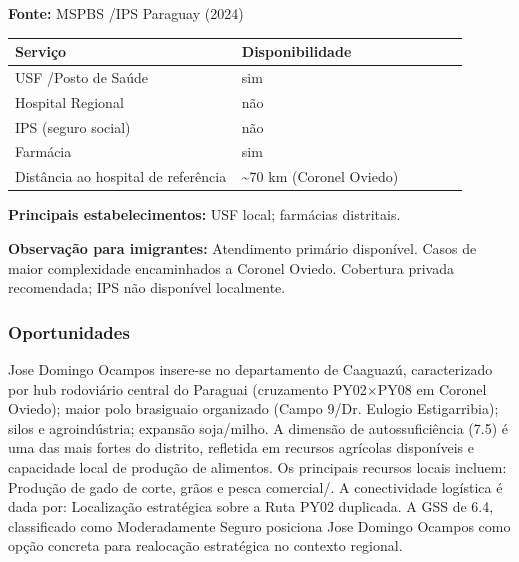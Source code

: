 \textbf{Fonte:} MSPBS /\allowbreak  IPS Paraguay (2024)

{\def\LTcaptype{none} %
\begin{longtable}{@{}>{\raggedright\arraybackslash}p{0.45\linewidth} >{\raggedright\arraybackslash}p{0.45\linewidth}@{}}
\toprule\noalign{}
Serviço & Disponibilidade \\
\midrule\noalign{}
\endhead
\bottomrule\noalign{}
\endlastfoot
USF /\allowbreak  Posto de Saúde & sim \\
Hospital Regional & não \\
IPS (seguro social) & não \\
Farmácia & sim \\
Distância ao hospital de referência & \textasciitilde70 km (Coronel
Oviedo) \\
\end{longtable}
}

\textbf{Principais estabelecimentos:} USF local; farmácias distritais.

\textbf{Observação para imigrantes:} Atendimento primário disponível.
Casos de maior complexidade encaminhados a Coronel Oviedo. Cobertura
privada recomendada; IPS não disponível localmente.
\newpage

\subsubsection*{Oportunidades}\label{oport-jose-domingo-ocampos-0515}
Jose Domingo Ocampos insere-se no departamento de Caaguazú, caracterizado por hub rodoviário central do Paraguai (cruzamento PY02×PY08 em Coronel Oviedo); maior polo brasiguaio organizado (Campo 9/Dr. Eulogio Estigarribia); silos e agroindústria; expansão soja/milho. A dimensão de autossuficiência (7.5) é uma das mais fortes do distrito, refletida em recursos agrícolas disponíveis e capacidade local de produção de alimentos. Os principais recursos locais incluem: Produção de gado de corte, grãos e pesca comercial/. A conectividade logística é dada por: Localização estratégica sobre a Ruta PY02 duplicada. A GSS de 6.4, classificado como Moderadamente Seguro posiciona Jose Domingo Ocampos como opção concreta para realocação estratégica no contexto regional.


